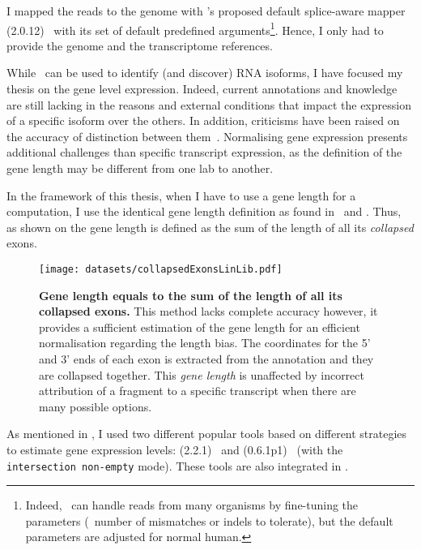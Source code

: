 I mapped the reads to the genome with \irap's proposed default splice-aware mapper
(2.0.12)~
with its set of default predefined arguments\footnote{Indeed, \toph\ can
handle reads from many organisms by fine-tuning the parameters (\eg\ number
of mismatches or indels to tolerate), but the default parameters are adjusted
for normal human.}. Hence, I only had to provide the
genome and the transcriptome references.


While \Rnaseq\ can be used to identify (and discover) \gls{RNA}
isoforms, I have focused my thesis on the gene level expression. Indeed, current
annotations and knowledge are still lacking in the reasons and
external conditions that impact the expression of a specific isoform over the
others. In addition, criticisms have been raised on the accuracy of distinction
between them~. Normalising gene expression
presents additional challenges than specific transcript expression,
as the definition of the gene length may be different from one lab to another.

In the framework of this thesis,
when I have to use a gene length for a computation,
I use the identical gene length definition as found in
\irap\ and \egxa.
Thus, as shown on  the gene
length is defined as the sum of the length of all its \emph{collapsed} exons.

\begin{figure}
    \texttt{[image: datasets/collapsedExonsLinLib.pdf]}\centering
        \caption[Gene length equals to the sum of the length of all its collapsed
        exons]{\label{fig:Genelength-collapsedExons}\textbf{Gene length equals to
        the sum of the length of all its collapsed exons.} This method lacks
        complete accuracy however, it provides a sufficient estimation of the
        gene length for an efficient normalisation regarding the length bias.
        The coordinates for the 5' and 3' ends of each exon is extracted from
        the annotation and they are collapsed together. This \emph{gene length}
        is unaffected by incorrect attribution of a fragment to a
        specific transcript when there are many possible options.}
    \end{figure}

As mentioned in , I used two different popular tools based on
different strategies to estimate
gene expression levels:
(2.2.1)~
and 
(0.6.1p1)~ (with the \texttt{intersection non-empty} mode).
These tools are also integrated in \irap.

